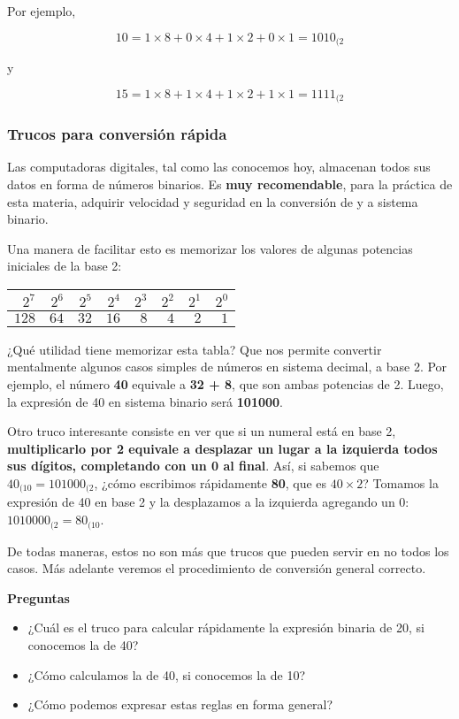 \documentclass[spanish,a4paper,]{article}
\providecommand{\tightlist}{%
  \setlength{\itemsep}{0pt}\setlength{\parskip}{0pt}}
\begin{document}
Por ejemplo,

\[10 = 1\times8 + 0\times4 + 1\times2 + 0\times1 = 1010_{(2}\]

y

\[15 = 1\times8 + 1\times4 + 1\times2 + 1\times1 = 1111_{(2}\]

\hypertarget{trucos-para-conversiuxf3n-ruxe1pida}{%
\subsubsection{Trucos para conversión
rápida}\label{trucos-para-conversiuxf3n-ruxe1pida}}

Las computadoras digitales, tal como las conocemos hoy, almacenan todos
sus datos en forma de números binarios. Es \textbf{muy recomendable},
para la práctica de esta materia, adquirir velocidad y seguridad en la
conversión de y a sistema binario.

Una manera de facilitar esto es memorizar los valores de algunas
potencias iniciales de la base 2:

\begin{longtable}[]{@{}rrrrrrrr@{}}
\toprule
\(2^7\) & \(2^6\) & \(2^5\) & \(2^4\) & \(2^3\) & \(2^2\) & \(2^1\) &
\(2^0\)\tabularnewline
\midrule
\endhead
\(128\) & \(64\) & \(32\) & \(16\) & \(8\) & \(4\) & \(2\) &
\(1\)\tabularnewline
\bottomrule
\end{longtable}

¿Qué utilidad tiene memorizar esta tabla? Que nos permite convertir
mentalmente algunos casos simples de números en sistema decimal, a base
2. Por ejemplo, el número \textbf{40} equivale a \textbf{32 + 8}, que
son ambas potencias de 2. Luego, la expresión de 40 en sistema binario
será \textbf{101000}.

Otro truco interesante consiste en ver que si un numeral está en base 2,
\textbf{multiplicarlo por 2 equivale a desplazar un lugar a la izquierda
todos sus dígitos, completando con un 0 al final}. Así, si sabemos que
\(40_{(10} = 101000_{(2}\), ¿cómo escribimos rápidamente \textbf{80},
que es \(40\times2\)? Tomamos la expresión de 40 en base 2 y la
desplazamos a la izquierda agregando un 0: \(1010000_{(2} = 80_{(10}\).

De todas maneras, estos no son más que trucos que pueden servir en no
todos los casos. Más adelante veremos el procedimiento de conversión
general correcto.

\textbf{Preguntas}

\begin{itemize}
\tightlist
\item
  ¿Cuál es el truco para calcular rápidamente la expresión binaria de
  20, si conocemos la de 40?
\item
  ¿Cómo calculamos la de 40, si conocemos la de 10?
\item
  ¿Cómo podemos expresar estas reglas en forma general?
\end{itemize}
\end{document}
